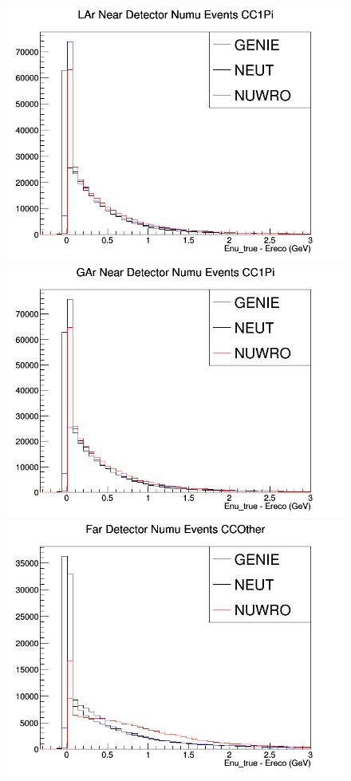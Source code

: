 \documentclass[12pt]{article}
\begin{document}
\begin{figure}[h]
\endminipage
{}
\includegraphics[width=\linewidth]{Ereco_Etrue/numu_LAr_CC1Pi.png}
\endminipage
{}
\includegraphics[width=\linewidth]{Ereco_Etrue/numu_GAr_CC1Pi.png}
\endminipage
\newline
{}
\includegraphics[width=\linewidth]{Ereco_Etrue/numu_FD_CCOther.png}

\end{figure}
\end{document}
